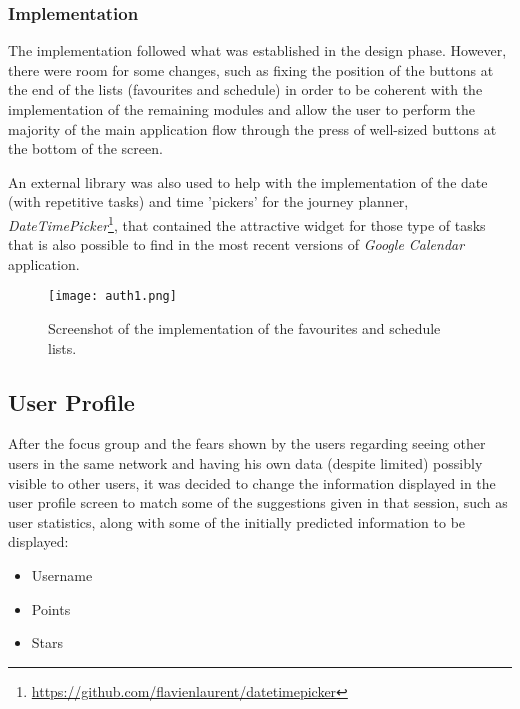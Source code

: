 \subsubsection{Implementation}

The implementation followed what was established in the design phase. However, there were room for some changes, such as fixing the position of the buttons at the end of the lists (favourites and schedule) in order to be coherent with the implementation of the remaining modules and allow the user to perform the majority of the main application flow through the press of well-sized buttons at the bottom of the screen.

An external library was also used to help with the implementation of the date (with repetitive tasks) and time 'pickers' for the journey planner, \emph{DateTimePicker}\footnote{\url{https://github.com/flavienlaurent/datetimepicker}}, that contained the attractive widget for those type of tasks that is also possible to find in the most recent versions of \emph{Google Calendar} application.

\newpage

\begin{figure}[h!]
  \begin{center}
    \leavevmode
    \texttt{[image: auth1.png]}
    \caption{Screenshot of the implementation of the favourites and schedule lists.}
    \label{fig:planner_impl}
  \end{center}
\end{figure}

\newpage

\subsection{User Profile}\label{userprofileimpl}

After the focus group and the fears shown by the users regarding seeing other users in the same network and having his own data (despite limited) possibly visible to other users, it was decided to change the information displayed in the user profile screen to match some of the suggestions given in that session, such as user statistics, along with some of the initially predicted information to be displayed:

\begin{itemize}
\item Username
\item Points
\item Stars
\end{itemize}

